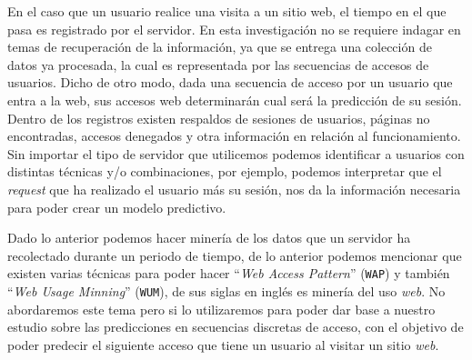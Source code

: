 En el caso  que un usuario realice una visita a un sitio web, el tiempo en el que pasa es registrado por el servidor. En esta investigación no se requiere indagar en temas de recuperación de la información, ya que se entrega una colección de datos ya procesada, la cual es representada por las secuencias de accesos de usuarios. 
Dicho de otro modo, dada una secuencia de acceso por un usuario que entra a la web, sus accesos web determinarán cual será la predicción de su sesión. Dentro de los registros existen respaldos de sesiones de usuarios, páginas no encontradas, accesos denegados y otra información en relación al funcionamiento. Sin importar el tipo de servidor que utilicemos podemos identificar a usuarios con distintas técnicas y/o combinaciones, por ejemplo, podemos interpretar que el \emph{request} que ha realizado el usuario más su sesión, nos da la información necesaria para poder crear un modelo predictivo. 

Dado lo anterior podemos hacer minería de los datos que un servidor ha recolectado durante un periodo de tiempo, de lo anterior  podemos mencionar que existen varias técnicas para poder hacer ``\emph{Web Access Pattern}'' (\texttt{WAP}) y también ``\emph{Web Usage Minning}'' (\texttt{WUM}), de sus siglas en inglés es minería del uso \emph{web}. No abordaremos este tema pero si lo utilizaremos para poder dar base a nuestro estudio sobre las predicciones en secuencias discretas de acceso, con el objetivo de poder predecir el siguiente acceso que tiene un usuario al visitar un sitio \emph{web}.


